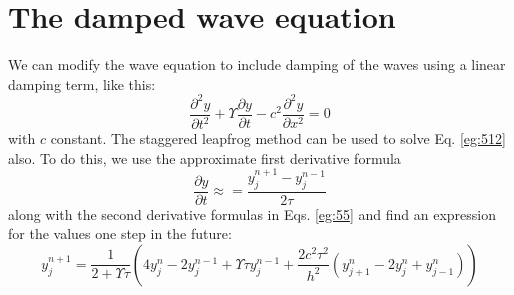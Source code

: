 \documentclass{book}
\theoremstyle{plain}
\theoremstyle{definition}
\numberwithin{exm}{chapter}
\theoremstyle{remark}
\theoremstyle{summary}
\theoremstyle{overview}
\begin{document}
\section*{The damped wave equation}
We can modify the wave equation to include damping of the waves using a linear
damping term, like this:
\begin{equation}\label{eq:512}
\frac{\partial^2 y}{\partial t^2} + \Upsilon \frac{\partial y}{\partial t} - c^2 \frac{\partial^2 y}{\partial x^2} = 0
\end{equation}
with $c$ constant. The staggered leapfrog method can be used to solve Eq. \eqref{eg:512}
also. To do this, we use the approximate first derivative formula
\begin{equation}\label{eq:513}
\frac{\partial y}{\partial t } \approx = \frac{y_j^{n+1} - y_j^{n-1}}{2 \tau}
\end{equation}
along with the second derivative formulas in Eqs. \eqref{eg:55} and find an expression for
the values one step in the future:
\begin{equation}\label{eq:514}
y^{n+1}_j = \frac{1}{2+ \Upsilon \tau}(4y^n_j-2y^{n-1}_j+ \Upsilon \tau y^{n-1}_j + \frac{2c^2 \tau^2}{h^2}(y^n_{j+1} - 2y^n_j + y^n_{j-1}))
\end{equation}
\end{document}
